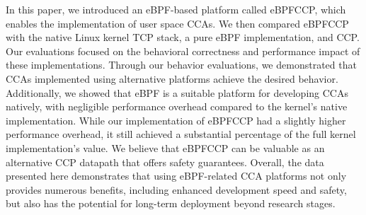 \documentclass[../main.tex]{subfiles}
\begin{document}
In this paper, we introduced an eBPF-based platform called eBPFCCP, which enables the implementation of user space CCAs. We then compared eBPFCCP with the native Linux kernel TCP stack, a pure eBPF implementation, and CCP. Our evaluations focused on the behavioral correctness and performance impact of these implementations. Through our behavior evaluations, we demonstrated that CCAs implemented using alternative platforms achieve the desired behavior. Additionally, we showed that eBPF is a suitable platform for developing CCAs natively, with negligible performance overhead compared to the kernel’s native implementation. While our implementation of eBPFCCP had a slightly higher performance overhead, it still achieved a substantial percentage of the full kernel implementation’s value. We believe that eBPFCCP can be valuable as an alternative CCP datapath that offers safety guarantees. Overall, the data presented here demonstrates that using eBPF-related CCA platforms not only provides numerous benefits, including enhanced development speed and safety, but also has the potential for long-term deployment beyond research stages. 
\end{document}
